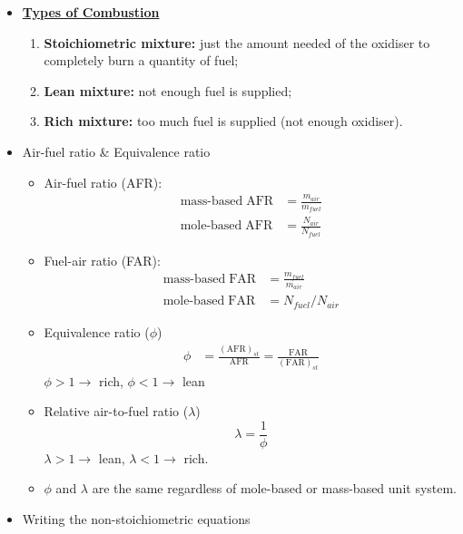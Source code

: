 \begin{itemize}
 
    \item {\color{blue}\textbf{\ul{Types of Combustion}}}
    \begin{enumerate}
        \item {\color{brown}\textbf{Stoichiometric mixture:}} just the amount needed of the oxidiser to completely burn a quantity of fuel;
        \item {\color{brown}\textbf{Lean mixture:}} not enough fuel is supplied;
        \item {\color{brown}\textbf{Rich mixture:}} too much fuel is supplied (not enough oxidiser).
    \end{enumerate}
    \item Air-fuel ratio \& Equivalence ratio
    \begin{itemize}
        \item Air-fuel ratio (AFR):
        \begin{align*}
            \text{mass-based} \; \text{AFR} &= \frac{m_{air}}{m_{fuel}} \\
            \text{mole-based} \; \text{AFR} &= \frac{N_{air}}{N_{fuel}}
        \end{align*}
        \item Fuel-air ratio (FAR):
        \begin{align*}
            \text{mass-based} \; \text{FAR} &= \frac{m_{fuel}}{m_{air}} \\
            \text{mole-based} \; \text{FAR} &= N_{fuel} / N_{air}
        \end{align*}
        \item Equivalence ratio ($\phi$)
        \begin{align*}
            \phi &= \frac{(\text{AFR})_{st}}{\text{AFR}} = \frac{\text{FAR}}{(\text{FAR})_{st}}
        \end{align*}
        $\phi >1 \rightarrow$ rich, $\phi < 1 \rightarrow$ lean
        \item Relative air-to-fuel ratio ($\lambda$)
        \begin{equation*}
            \lambda = \frac{1}{\phi}
        \end{equation*}
        $\lambda > 1 \rightarrow$ lean, $\lambda < 1 \rightarrow$ rich.
        \item $\phi$ and $\lambda$ are the same regardless of mole-based or mass-based unit system.
    \end{itemize}
    \item Writing the non-stoichiometric equations
    \begin{itemize}

\end{itemize}
\end{itemize}
